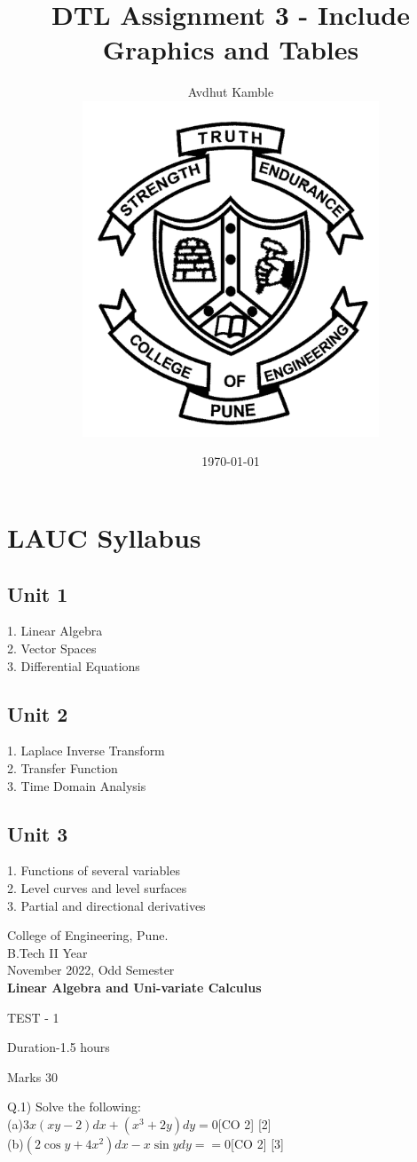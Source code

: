\documentclass[12pt]{article}
\title{DTL Assignment 3 - Include Graphics and Tables}
\author{Avdhut Kamble  \\		\includegraphics[height=10cm]{COEP.png}}
\date{\today}
\begin{document}
	
	\maketitle
	\newpage
	
	\title{}
	
	
	
	\section{LAUC Syllabus}
	\subsection{Unit 1}
	1. Linear Algebra\\
	2. Vector Spaces\\
	3. Differential Equations\\
	\subsection{Unit 2}
	1. Laplace Inverse Transform\\
	2. Transfer Function\\
	3. Time Domain Analysis\\
	\subsection{Unit 3}
	1. Functions of several variables \\
	2. Level curves and level surfaces\\
	3. Partial and directional derivatives\\
	
	
	\newpage
	\begin{flushleft}
		\bfseries\large
		\begin{center}
			College of Engineering, Pune. \\
			\normalfont\normalsize
			B.Tech II Year \\
			November 2022, Odd Semester
			\bfseries \\
			Linear Algebra and Uni-variate Calculus \qquad
			
			TEST - 1
		\end{center}
		
		
		\bigskip
		
		\normalfont\normalsize
		
		\raggedright Duration-1.5 hours 
		
		\raggedleft Marks 30  
		\\
		
		
		\bfseries
		\raggedright
		Q.1) Solve the following:\\
		\normalfont\normalsize
		\hspace{1cm}(a)$3x(xy-2)dx+(x^3+2y)dy=0$\hspace{4.5cm}[CO 2] [2]\\[6 pt]
		\hspace{1cm}(b)$(2\cos{y} + 4x^2)dx -x\sin{y}dy==0$\hspace{4.09cm}[CO 2]    [3]\\
	\end{flushleft} 
	
\end{document}
